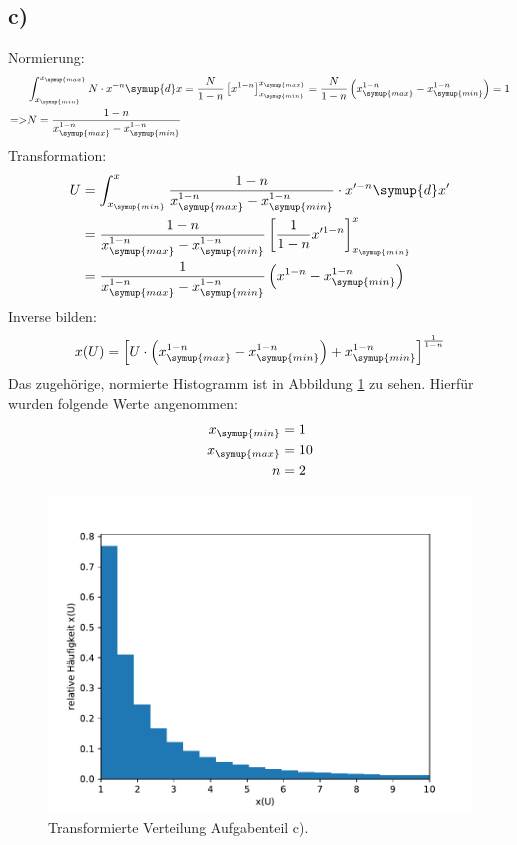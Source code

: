 \subsection{c)}
Normierung:
\begin{align*}
  &\int_{x_{\symup{min}}}^{x_{\symup{max}}} N \cdot x^{-n} \symup{d}x = \frac{N}{1-n} \left[x^{1-n} \right]_{x_{\symup{min}}}^{x_{\symup{max}}}
  = \frac{N}{1-n}\left( x_{\symup{max}}^{1-n}-x_{\symup{min}}^{1-n} \right) = 1 \\
  => & N = \frac{1-n}{x_{\symup{max}}^{1-n}-x_{\symup{min}}^{1-n}}
\end{align*}
Transformation:
\begin{align*}
  U&=\int_{x_{\symup{min}}}^x \frac{1-n}{x_{\symup{max}}^{1-n}-x_{\symup{min}}^{1-n}} \cdot x'^{-n} \symup{d}x' \\
   &= \frac{1-n}{x_{\symup{max}}^{1-n}-x_{\symup{min}}^{1-n}}\left[\frac{1}{1-n} x'^{1-n} \right]_{x_{\symup{min}}}^x \\
   &= \frac{1}{x_{\symup{max}}^{1-n}-x_{\symup{min}}^{1-n}} \left( x^{1-n}-x_{\symup{min}}^{1-n} \right)
\end{align*}
Inverse bilden:
\begin{align*}
  x(U) = \left[ U \cdot \left( x_{\symup{max}}^{1-n}-x_{\symup{min}}^{1-n} \right) + x_{\symup{min}}^{1-n}  \right]   ^{\frac{1}{1-n}}
\end{align*}
Das zugehörige, normierte Histogramm ist in Abbildung \ref{5.c} zu sehen. Hierfür wurden folgende Werte angenommen:
\begin{align*}
  x_{\symup{min}} &= 1 \\
  x_{\symup{max}} &= 10 \\
  n&=2
\end{align*}
\begin{figure}[h]
  \centering
  \includegraphics[scale=0.7]{Aufgabe05/Transformierte3.pdf}
  \caption{Transformierte Verteilung Aufgabenteil c).}
  \label{5.c}
\end{figure}

